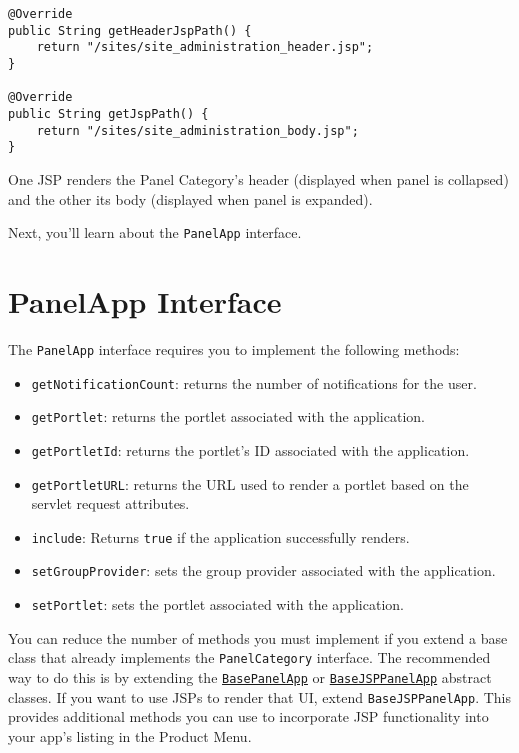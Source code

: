 \begin{verbatim}
@Override
public String getHeaderJspPath() {
    return "/sites/site_administration_header.jsp";
}

@Override
public String getJspPath() {
    return "/sites/site_administration_body.jsp";
}
\end{verbatim}

One JSP renders the Panel Category's header (displayed when panel is
collapsed) and the other its body (displayed when panel is expanded).

Next, you'll learn about the \texttt{PanelApp} interface.

\section{PanelApp Interface}\label{panelapp-interface}

The \texttt{PanelApp} interface requires you to implement the following
methods:

\begin{itemize}
\tightlist
\item
  \texttt{getNotificationCount}: returns the number of notifications for
  the user.
\item
  \texttt{getPortlet}: returns the portlet associated with the
  application.
\item
  \texttt{getPortletId}: returns the portlet's ID associated with the
  application.
\item
  \texttt{getPortletURL}: returns the URL used to render a portlet based
  on the servlet request attributes.
\item
  \texttt{include}: Returns \texttt{true} if the application
  successfully renders.
\item
  \texttt{setGroupProvider}: sets the group provider associated with the
  application.
\item
  \texttt{setPortlet}: sets the portlet associated with the application.
\end{itemize}

You can reduce the number of methods you must implement if you extend a
base class that already implements the \texttt{PanelCategory} interface.
The recommended way to do this is by extending the
\href{https://docs.liferay.com/dxp/apps/application-list/latest/javadocs/com/liferay/application/list/BasePanelApp.html}{\texttt{BasePanelApp}}
or
\href{https://docs.liferay.com/dxp/apps/application-list/latest/javadocs/com/liferay/application/list/BaseJSPPanelApp.html}{\texttt{BaseJSPPanelApp}}
abstract classes. If you want to use JSPs to render that UI, extend
\texttt{BaseJSPPanelApp}. This provides additional methods you can use
to incorporate JSP functionality into your app's listing in the Product
Menu.

